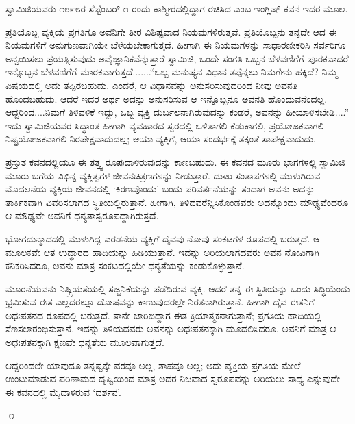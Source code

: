 ಸ್ವಾಮಿಜಿಯವರು ೧೮೯೮ರ ಸೆಪ್ಟೆಂಬರ್ ೧ ರಂದು ಕಾಶ್ಮೀರದಲ್ಲಿದ್ದಾಗ ರಚಿಸಿದ  ಎಂಬ ಇಂಗ್ಲಿಷ್ ಕವನ ಇದರ ಮೂಲ.

ಪ್ರತಿಯೊಬ್ಬ ವ್ಯಕ್ತಿಯ ಪ್ರಗತಿಗೂ ಅವನಿಗೇ ತೀರ ವಿಶಿಷ್ಟವಾದ ನಿಯಮಗಳಿರುತ್ತವೆ. ಪ್ರತಿಯೊಬ್ಬನು ತನ್ನದೇ ಆದ ಈ ನಿಯಮಗಳಿಗೆ ಅನುಗುಣವಾಗಿಯೇ ಬೆಳೆಯಬೇಕಾಗುತ್ತದೆ. ಹೀಗಾಗಿ ಈ ನಿಯಮಗಳನ್ನು ಸಾಧಾರಣೀಕರಿಸಿ ಸರ್ವರಿಗೂ ಅನ್ವಯಿಸಲು ಪ್ರಯತ್ನಿಸುವುದು ಅವೈಜ್ಞಾನಿಕವೆನ್ನುತ್ತಾರೆ ಸ್ವಾಮಿಜಿ, ಒಂದೇ ಸಂಗತಿ ಒಬ್ಬನ ಬೆಳವಣಿಗೆಗೆ ಪೂರಕವಾದರೆ ಇನ್ನೊಬ್ಬನ ಬೆಳವಣಿಗೆಗೆ ಮಾರಕವಾಗುತ್ತದೆ.......“ಒಬ್ಬ ಮನುಷ್ಯನ ವಿಧಾನ ತಪ್ಪೆನ್ನಲು ನಿಮಗೇನು ಹಕ್ಕಿದೆ? ನಿಮ್ಮ ವಿಷಯದಲ್ಲಿ ಅದು ತಪ್ಪಿರಬಹುದು. ಎಂದರೆ, ಆ ವಿಧಾನವನ್ನು ಅನುಸರಿಸುವುದರಿಂದ ನೀವು ಅವನತಿ ಹೊಂದಬಹುದು. ಆದರೆ ಇದರ ಅರ್ಥ ಅದನ್ನು ಅನುಸರಿಸುವ ಆ ಇನ್ನೊಬ್ಬನೂ ಅವನತಿ ಹೊಂದುವನೆಂದಲ್ಲ. ಆದ್ದರಿಂದ....ನಿಮಗೆ ತಿಳಿವಳಿಕೆ ಇದ್ದು, ಒಬ್ಬ ವ್ಯಕ್ತಿ ದುರ್ಬಲನಾಗಿರುವುದನ್ನು ಕಂಡರೆ, ಅವನನ್ನು ಹೀಯಾಳಿಸಬೇಡಿ....” ಇದು ಸ್ವಾಮಿಜಿಯವರ ಸಿದ್ಧಾಂತ  ಹೀಗಾಗಿ ವ್ಯವಹಾರದ ಸ್ವರದಲ್ಲಿ ಒಳಿತಾಗಲಿ ಕೆಡುಕಾಗಲಿ, ಪ್ರಯೋಜಕವಾಗಲಿ ನಿಷ್ಪ್ರಯೋಜಕವಾಗಲಿ ನಿರಪೇಕ್ಷವಾದುದಲ್ಲ; ಆಯಾ ವ್ಯಕ್ತಿಗೆ, ಆಯಾ ಸಂದರ್ಭಕ್ಕೆ ತಕ್ಕಂತೆ ಸಾಪೇಕ್ಷವಾದುದು.

ಪ್ರಸ್ತುತ ಕವನದಲ್ಲಿಯೂ ಈ ತತ್ತ್ವ ರೂಪುದಾಳಿರುವುದನ್ನು ಕಾಣಬಹುದು. ಈ ಕವನದ ಮೂರು ಭಾಗಗಳಲ್ಲಿ ಸ್ವಾಮಿಜಿ ಮೂರು ಬಗೆಯ ವಿಭಿನ್ನ ವ್ಯಕ್ತಿತ್ವಗಳ ಜೀವನಚಿತ್ರಣಗಳನ್ನು ನೀಡುತ್ತಾರೆ. ದುಃಖ-ಸಂತಾಪಗಳಲ್ಲಿ ಮುಳುಗಿರುವ ಮೊದಲನೆಯ ವ್ಯಕ್ತಿಯ ಜೀವನದಲ್ಲಿ ‘ಕಿರಣವೊಂದು’ ಬಂದು ಪರಿವರ್ತನೆಯನ್ನು ತಂದಾಗ ಅವನು ಅದನ್ನು ತಾರ್ಕಿಕವಾಗಿ ವಿವರಿಸಲಾಗದ ಸ್ಥಿತಿಯಲ್ಲಿರುತ್ತಾನೆ. ಹೀಗಾಗಿ, ತಿಳಿದವರೆನ್ನಿಸಿಕೊಂಡವರು ಅದನ್ನೊಂದು ಮೌಢ್ಯವೆಂದರೂ ಆ ಮೌಢ್ಯವೇ ಅವನಿಗೆ ಧನ್ಯತಾಸ್ವರೂಪದ್ದಾಗಿರುತ್ತದೆ.

ಭೋಗದುನ್ಮಾದದಲ್ಲಿ ಮುಳುಗಿದ್ದ ಎರಡನೆಯ ವ್ಯಕ್ತಿಗೆ ದೈವವು ನೋವು-ಸಂಕಟಗಳ ರೂಪದಲ್ಲಿ ಬರುತ್ತದೆ. ಆ ಮೂಲಕವೇ ಆತ ಉದ್ಧಾರದ ಹಾದಿಯನ್ನು ಹಿಡಿಯುತ್ತಾನೆ. ಇದನ್ನು ಅರಿಯಲಾಗದವರು ಅವನ ನೋವಿಗಾಗಿ ಕನಿಕರಿಸಿದರೂ, ಅವನು ಮಾತ್ರ ಸಂಕಟದಲ್ಲಿಯೇ ಧನ್ಯತೆಯನ್ನು ಕಂಡುಕೊಳ್ಳುತ್ತಾನೆ.

ಮೂರನೆಯವನು ನಿಷ್ಕ್ರಿಯತೆಯಲ್ಲಿ ಸಜ್ಜನಿಕೆಯನ್ನು ಪಡೆದಿರುವ ವ್ಯಕ್ತಿ. ಆದರೆ ತನ್ನ ಈ ಸ್ಥಿತಿಯನ್ನು ಒಂದು ಸಿದ್ಧಿಯೆಂದು ಭ್ರಮಿಸುವ ಈತ ಎಲ್ಲದರಲ್ಲೂ ದೋಷವನ್ನು ಕಾಣುವುದರಲ್ಲೇ ನಿರತನಾಗಿರುತ್ತಾನೆ. ಹೀಗಾಗಿ ದೈವ ಈತನಿಗೆ ಅಧಃಪತನದ ರೂಪದಲ್ಲಿ ಬರುತ್ತದೆ. ತಾನೇ ಜಾರಿಬಿದ್ದಾಗ ಈತ ಕ್ರಿಯಾತ್ಮಕನಾಗುತ್ತಾನೆ; ಪ್ರಗತಿಯ ಹಾದಿಯಲ್ಲಿ ಸೆಣಸಲಾರಂಭಿಸುತ್ತಾನೆ. ಇದನ್ನು ತಿಳಿಯದವರು ಅವನನ್ನು ಅಧಃಪತನಕ್ಕಾಗಿ ಮೂದಲಿಸಿದರೂ, ಅವನಿಗೆ ಮಾತ್ರ ಆ ಅಧಃಪತನಕ್ಕಾಗಿ ಕ್ಷಣವೇ ಧನ್ಯತೆಯ ಮೂಲವಾಗುತ್ತದೆ.

ಆದ್ದರಿಂದಲೇ ಯಾವುದೂ ತನ್ನಷ್ಟಕ್ಕೇ ವರವೂ ಅಲ್ಲ, ಶಾಪವೂ ಅಲ್ಲ; ಅದು ವ್ಯಕ್ತಿಯ ಪ್ರಗತಿಯ ಮೇಲೆ ಉಂಟುಮಾಡುವ ಪರಿಣಾಮದ ದೃಷ್ಟಿಯಿಂದ ಮಾತ್ರ ಅದರ ನಿಜವಾದ ಸ್ವರೂಪವನ್ನು ಅರಿಯಲು ಸಾಧ್ಯ ಎನ್ನುವುದೇ ಈ ಕವನದಲ್ಲಿ ಮೈದಾಳಿರುವ ‘ದರ್ಶನ’.

\begin{center}
-೧-
\end{center}

